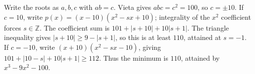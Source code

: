 Write the roots as $a,b,c$ with $ab=c$. Vieta gives $abc=c^2=100$, so $c=\pm10$. If $c=10$, write $p(x)=(x-10)(x^2-sx+10)$; integrality of the $x^2$ coefficient forces $s\in\mathbb Z$. The coefficient sum is $101+|s+10|+10|s+1|$. The triangle inequality gives $|s+10|\ge9-|s+1|$, so this is at least $110$, attained at $s=-1$. If $c=-10$, write $(x+10)(x^2-sx-10)$, giving $101+|10-s|+10|s+1|\ge112$. Thus the minimum is $\boxed{110}$, attained by $x^3-9x^2-100$.
